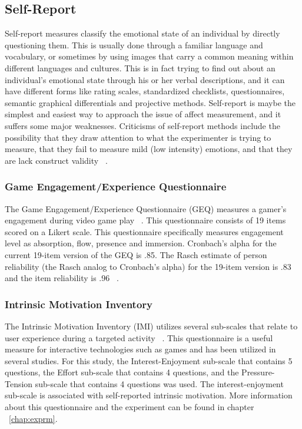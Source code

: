 \subsection{Self-Report}
Self-report measures classify the emotional state of an individual by directly questioning them. This is usually done through a familiar language and vocabulary, or sometimes by using images that carry a common meaning within different languages and cultures. This is in fact trying to find out about an individual's emotional state through his or her verbal descriptions, and it can have different forms like rating scales, standardized checklists, questionnaires, semantic graphical differentials and projective methods. Self-report is maybe the simplest and easiest way to approach the issue of affect measurement, and it suffers some major weaknesses. Criticisms of self-report methods include the possibility that they draw attention to what the experimenter is trying to measure, that they fail to measure mild (low intensity) emotions, and that they are lack construct validity ~\cite{isen2007some}.

\subsubsection{Game Engagement/Experience Questionnaire}
The Game Engagement/Experience Questionnaire (GEQ) measures a gamer's engagement during video game play ~\cite{brockmyer2009development}. This questionnaire consists of 19 items scored on a Likert scale. This questionnaire specifically measures engagement level as absorption, flow, presence and immersion. Cronbach's alpha for the current 19-item version of the GEQ is .85. The Rasch estimate of person reliability (the Rasch analog to Cronbach's alpha) for the 19-item version is .83 and the item reliability is .96 ~\cite{brockmyer2009development}.%

\subsubsection{Intrinsic Motivation Inventory}
The Intrinsic Motivation Inventory (IMI) utilizes several sub-scales that relate to user experience during a targeted activity ~\cite{ryan1983relation}. This questionnaire is a useful measure for interactive technologies such as games and has been utilized in several studies. For this study, the Interest-Enjoyment sub-scale that contains 5 questions, the Effort sub-scale that contains 4 questions, and the Pressure-Tension sub-scale that contains 4 questions was used. The interest-enjoyment sub-scale is associated with self-reported intrinsic motivation. More information about this questionnaire and the experiment can be found in chapter ~\ref{chap:exprm}.

